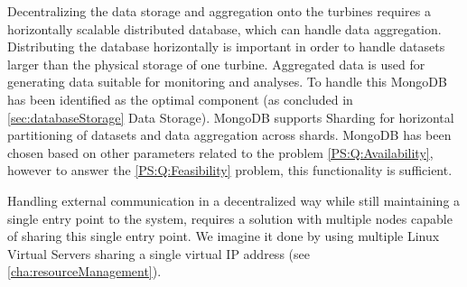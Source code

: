 Decentralizing the data storage and aggregation onto the turbines requires a horizontally scalable distributed database, which can handle data aggregation.
Distributing the database horizontally is important in order to handle datasets larger than the physical storage of one turbine.
Aggregated data is used for generating data suitable for monitoring and analyses.
To handle this MongoDB~\cite{mongodb} has been identified as the optimal component (as concluded in \cref{sec:databaseStorage} Data Storage). MongoDB supports Sharding for horizontal partitioning of datasets and data aggregation across shards. MongoDB has been chosen based on other parameters related to the problem \ref{PS:Q:Availability}, however to answer the \ref{PS:Q:Feasibility} problem, this functionality is sufficient. 

Handling external communication in a decentralized way while still maintaining a single entry point to the system,
requires a solution with multiple nodes capable of sharing this single entry point.
We imagine it done by using multiple Linux Virtual Servers sharing a single virtual IP address (see \cref{cha:resourceManagement}).

\clearpage